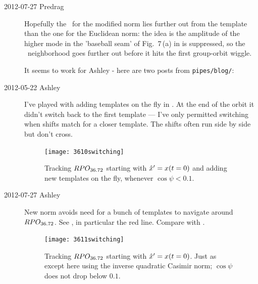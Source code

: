 \begin{description}
\item[2012-07-27 Predrag]
Hopefully the \chartBord\ for the modified norm lies further out from the
template than the one for the Euclidean norm: the idea is the amplitude
of the higher mode in the 'baseball seam' of Fig.~7\,(a) in
{} is suppressed, so the \template\ neighborhood goes
further out before it hits the first group-orbit wiggle.

It seems to work for Ashley - here are two posts from
\texttt{pipes/blog/}:

\item[2012-05-22 Ashley]
 I've played with adding templates on the fly in
 .  At the end of the orbit
 it didn't switch back to the first template --- I've only permitted
 switching when shifts match for a closer template.  The shifts
 often run side by side but don't cross.
 \begin{figure}
 \begin{center}
  \texttt{[image: 3610switching]}
 \end{center}
 \caption{ \label{fig:3610switching}
    Tracking $RPO_{36.72}$ starting with ${\hat{x}'}{}=x(t=0)$ and
    adding new templates on the fly, whenever $\cos\psi<0.1$.
 }
 \end{figure}

\item[2012-07-27 Ashley]
New norm avoids need for a bunch of templates
to navigate around $RPO_{36.72}$.  See ,
in particular the red line.  Compare with .
 \begin{figure}
 \begin{center}
  \texttt{[image: 3611switching]}
 \end{center}
 \caption{ \label{fig:3611switching}
    Tracking $RPO_{36.72}$ starting with ${\hat{x}'}{}=x(t=0)$.
    Just as  except here using the inverse
    quadratic Casimir norm;
    $\cos\psi$ does not drop below $0.1$.
 }
 \end{figure}


\end{description}
